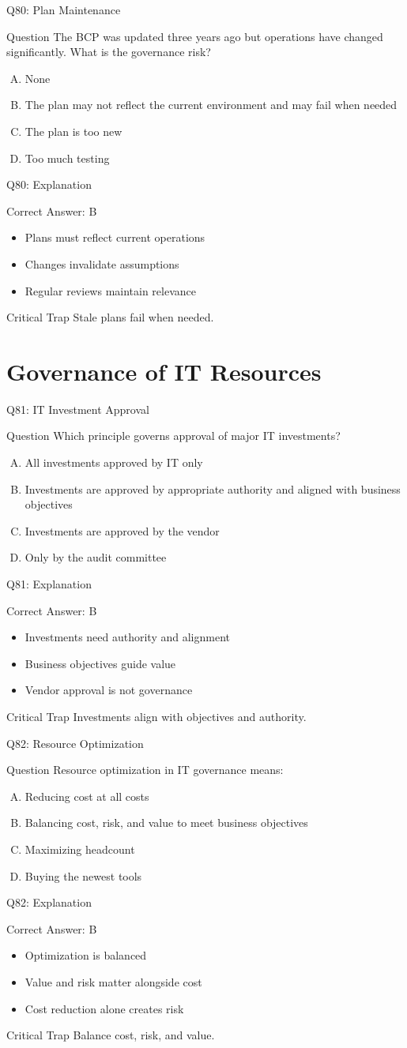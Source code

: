 \documentclass[aspectratio=169]{beamer}
\newcommand{\hq}[7]{%
	\begin{frame}{Q#1: #2}
		\begin{block}{Question}
			#3
		\end{block}
		\begin{enumerate}[(A)]
			#4
		\end{enumerate}
	\end{frame}
	\begin{frame}{Q#1: Explanation}
		\begin{block}{Correct Answer: #5}
			\begin{itemize}
				#6
			\end{itemize}
		\end{block}
		\begin{alertblock}{Critical Trap}
			#7
		\end{alertblock}
	\end{frame}
}
\begin{document}
	\hq{80}{Plan Maintenance}
	{The BCP was updated three years ago but operations have changed significantly. What is the governance risk?}
	{\item None
		\item The plan may not reflect the current environment and may fail when needed
		\item The plan is too new
		\item Too much testing}
	{B}
	{\item Plans must reflect current operations
		\item Changes invalidate assumptions
		\item Regular reviews maintain relevance}
	{Stale plans fail when needed.}
	
	\section{Governance of IT Resources}
	
	\hq{81}{IT Investment Approval}
	{Which principle governs approval of major IT investments?}
	{\item All investments approved by IT only
		\item Investments are approved by appropriate authority and aligned with business objectives
		\item Investments are approved by the vendor
		\item Only by the audit committee}
	{B}
	{\item Investments need authority and alignment
		\item Business objectives guide value
		\item Vendor approval is not governance}
	{Investments align with objectives and authority.}
	
	\hq{82}{Resource Optimization}
	{Resource optimization in IT governance means:}
	{\item Reducing cost at all costs
		\item Balancing cost, risk, and value to meet business objectives
		\item Maximizing headcount
		\item Buying the newest tools}
	{B}
	{\item Optimization is balanced
		\item Value and risk matter alongside cost
		\item Cost reduction alone creates risk}
	{Balance cost, risk, and value.}
	
\end{document}

